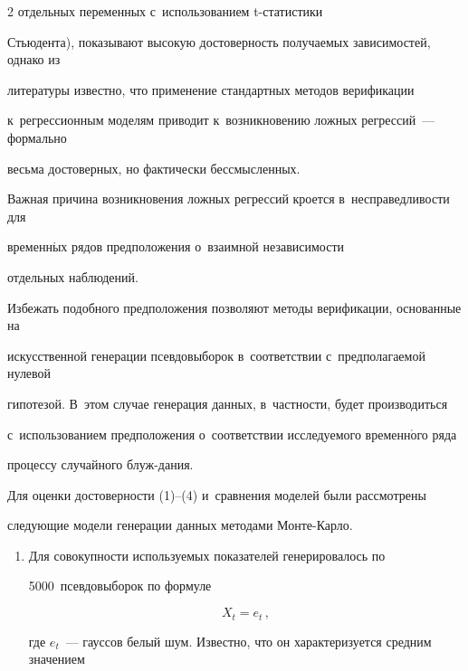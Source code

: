 \begin{multicols}{2}
 отдельных переменных с~использованием t-ста\-тисти\-ки 


Стьюдента), показывают высокую достоверность получаемых зависимостей, однако из 


литературы известно, что применение стандартных методов верификации 


к~регрессионным моделям приводит к~возникновению ложных регрессий~--- формально 


весьма достоверных, но фактически бессмысленных.


  


  Важная причина возникновения ложных регрессий кроется в~несправедливости для 


временн$\acute{\mbox{ы}}$х рядов предположения о~взаимной не\-за\-ви\-си\-мости\linebreak


 отдельных наблюдений. 


Избежать подобного предположения позволяют методы верификации, основанные на 


искусственной генерации псевдовыборок в~соответствии с~предполагаемой нулевой 


\mbox{гипотезой}. В~этом случае генерация данных, в~част\-ности, будет производиться 


с~использованием предположения о~соответствии исследуемого временн$\acute{\mbox{о}}$го ряда 


процессу случайного блуж-\linebreak дания.


  


  Для оценки достоверности (1)--(4) и~сравнения моделей были рассмотрены 


следующие модели генерации данных методами Монте-Карло.


  \begin{enumerate}[1.]


  \item Для совокупности используемых показателей генерировалось по 


5000~псевдовыборок по формуле


  \begin{equation}


  X_t=e_t\,,


  \label{e5-ki}


  \end{equation}


  где $e_t$~--- гауссов белый шум. Известно, что он характеризуется средним значением 



\end{enumerate}
\end{multicols}
